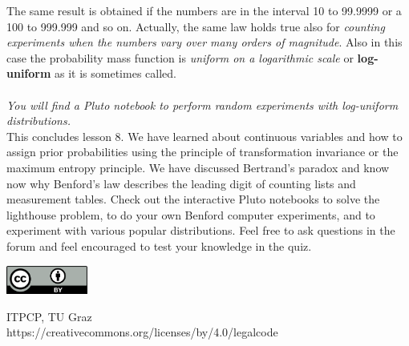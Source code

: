\documentclass[12pt, a4paper]{scrartcl}
\begin{document}
The same result is obtained if the numbers are in the interval 10 to 99.9999
or a 100 to 999.999 and so on.
Actually, the same law holds true also for \textit{counting experiments when the
numbers vary over many orders of magnitude}. Also in this case the probability mass function is \textit{uniform on a logarithmic scale} or  \textbf{log-uniform} as it is
sometimes called.\\

\\

\textit{You will find a Pluto notebook to perform random experiments with log-uniform distributions.}\\


This concludes lesson 8. We have learned about continuous variables and
how to assign prior probabilities using the principle of transformation invariance or the maximum entropy principle. We have discussed Bertrand's paradox and know now why Benford’s law
describes the leading digit of counting lists and measurement tables.
Check out the interactive Pluto notebooks to solve the lighthouse problem,
to do your own Benford computer experiments, and to experiment with
various popular distributions. Feel free to ask questions in the forum and feel encouraged to test your knowledge in the quiz.

\vspace{2cm}
\begin{minipage}[t]{1\textwidth}
	\raggedleft
	\centering
	\includegraphics[width = 0.20\textwidth]{CC-BY_icon}
	\vspace{0.2cm}
	
	\centering
	{\large ITPCP, TU Graz} \\
	https://creativecommons.org/licenses/by/4.0/legalcode
\end{minipage}
\end{document}
